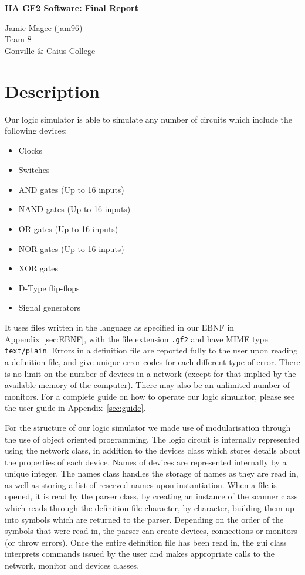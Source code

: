 \documentclass[a4paper,10pt]{article}
\begin{document}
\begin{center}
\Huge \textbf{IIA GF2 Software: Final Report}

\large Jamie Magee (jam96) \\ Team 8 \\ Gonville \& Caius College
\end{center}

\tableofcontents
\pagebreak

\section{Description}
Our logic simulator is able to simulate any number of circuits which include the following devices:

\begin{itemize}
\item Clocks
\item Switches
\item AND gates (Up to 16 inputs)
\item NAND gates (Up to 16 inputs)
\item OR gates (Up to 16 inputs)
\item NOR gates (Up to 16 inputs)
\item XOR gates
\item D-Type flip-flops
\item Signal generators
\end{itemize}

It uses files written in the language as specified in our EBNF in Appendix~\ref{sec:EBNF}, with the file extension \texttt{.gf2} and have MIME type \texttt{text/plain}. Errors in a definition file are reported fully to the user upon reading a definition file, and give unique error codes for each different type of error. There is no limit on the number of devices in a network (except for that implied by the available memory of the computer). There may also be an unlimited number of monitors. For a complete guide on how to operate our logic simulator, please see the user guide in Appendix~\ref{sec:guide}.

For the structure of our logic simulator we made use of modularisation through the use of object oriented programming. The logic circuit is internally represented using the network class, in addition to the devices class which stores details about the properties of each device. Names of devices are represented internally by a unique integer. The names class handles the storage of names as they are read in, as well as storing a list of reserved names upon instantiation. When a file is opened, it is read by the parser class, by creating an instance of the scanner class which reads through the definition file character, by character, building them up into symbols which are returned to the parser. Depending on the order of the symbols that were read in, the parser can create devices, connections or monitors (or throw errors). Once the entire definition file has been read in, the gui class interprets commands issued by the user and makes appropriate calls to the network, monitor and devices classes. 
\end{document}
